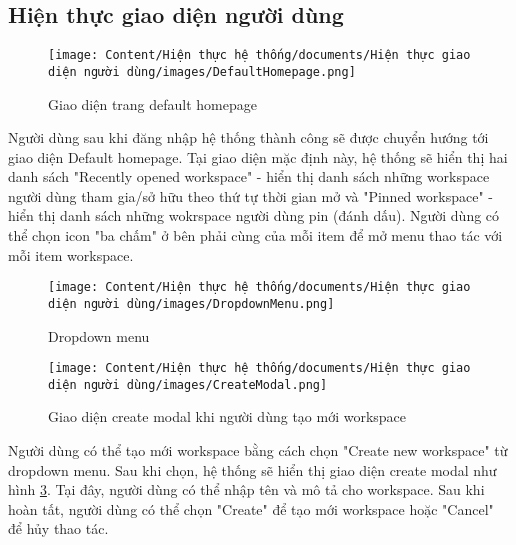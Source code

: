 \subsection{Hiện thực giao diện người dùng}

\begin{figure}[H]
    \centering
    \texttt{[image: Content/Hiện thực hệ thống/documents/Hiện thực giao diện người dùng/images/DefaultHomepage.png]}
    \vspace{0.5cm}
    \caption{Giao diện trang default homepage}
    \label{fig: Giao diện trang default homepage}
\end{figure}

Người dùng sau khi đăng nhập hệ thống thành công sẽ được chuyển hướng tới giao diện Default homepage. Tại giao diện mặc định này, hệ thống sẽ hiển thị hai danh sách "Recently opened workspace" - hiển thị danh sách những workspace người dùng tham gia/sở hữu theo thứ tự thời gian mở và "Pinned workspace" - hiển thị danh sách những wokrspace người dùng pin (đánh dấu). Người dùng có thể chọn icon "ba chấm" ở bên phải cùng của mỗi item để mở menu thao tác với mỗi item workspace.

\begin{figure}[H]
    \centering
    \texttt{[image: Content/Hiện thực hệ thống/documents/Hiện thực giao diện người dùng/images/DropdownMenu.png]}
    \vspace{0.5cm}
    \caption{Dropdown menu}
    \label{fig: Giao diện dropdown menu của mỗi item workspace}
\end{figure}

\begin{figure}[H]
    \centering
    \texttt{[image: Content/Hiện thực hệ thống/documents/Hiện thực giao diện người dùng/images/CreateModal.png]}
    \vspace{0.5cm}
    \caption{Giao diện create modal khi người dùng tạo mới workspace}
    \label{fig: Giao diện create modal khi người dùng tạo mới workspace}
\end{figure}

Người dùng có thể tạo mới workspace bằng cách chọn "Create new workspace" từ dropdown menu. Sau khi chọn, hệ thống sẽ hiển thị giao diện create modal như hình \ref{fig: Giao diện create modal khi người dùng tạo mới workspace}. Tại đây, người dùng có thể nhập tên và mô tả cho workspace. Sau khi hoàn tất, người dùng có thể chọn "Create" để tạo mới workspace hoặc "Cancel" để hủy thao tác.

